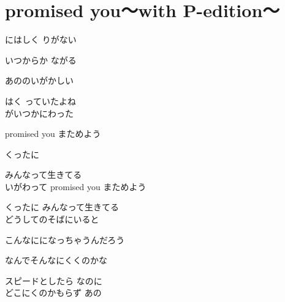 \section{ promised you～with P-edition～}


\large{

にはしく りがない

いつからか ながる

あののいがかしい

はく っていたよね
\\

がいつかにわった

promised you まためよう

くったに 

みんなって生きてる
\\

いがわって promised you まためよう

くったに みんなって生きてる
\\

どうしてのそばにいると

こんなにになっちゃうんだろう

なんでそんなにくくのかな

スピードとしたら なのに
\\

どこにくのかもらず あの

}
